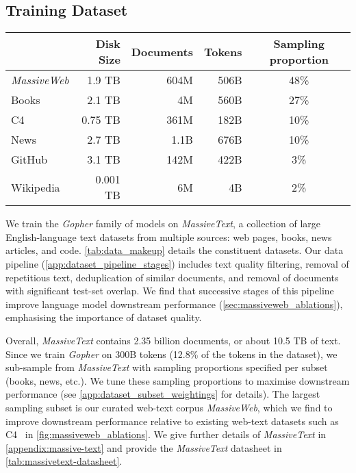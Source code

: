 \documentclass[11pt, a4paper, logo, internal, copyright, nonumbering]{deepmind}
\newcommand{\massivetext}{\textit{MassiveText}\xspace}
\newcommand{\massiveweb}{\textit{MassiveWeb}\xspace}
\newcommand{\gopher}{\textit{Gopher}\xspace}
\begin{document}
\subsection{Training Dataset}
\label{method:dataset}
\begin{table*}[t]
\centering
\begin{tabular}{l r r r c}
\toprule
           & Disk Size & Documents & Tokens  & Sampling proportion \\ 
\midrule
\massiveweb & 1.9 TB  & 604M & 506B & 48\% \\
Books       & 2.1 TB  & 4M   & 560B & 27\% \\
C4          & 0.75 TB  & 361M & 182B & 10\% \\
News        & 2.7 TB  & 1.1B & 676B & 10\% \\
GitHub      & 3.1 TB  & 142M & 422B & 3\% \\ 
Wikipedia   & 0.001 TB & 6M   & 4B  & 2\% \\
\bottomrule
\end{tabular}
    \caption{\textbf{MassiveText data makeup.} For each subset of \massivetext, we list its total disk size, its number of documents, and its number of SentencePiece tokens. During training we sample from \massivetext non-uniformly, using the sampling proportion shown in the right-most column.}
    \label{tab:data_makeup}
\end{table*}

We train the \gopher family of models on \massivetext, a collection of large English-language text datasets from multiple sources: web pages, books, news articles, and code. \autoref{tab:data_makeup} details the constituent datasets. Our data pipeline (\autoref{app:dataset_pipeline_stages}) includes text quality filtering, removal of repetitious text, deduplication of similar documents, and removal of documents with significant test-set overlap. 
We find that successive stages of this pipeline improve language model downstream performance (\autoref{sec:massiveweb_ablations}), emphasising the importance of dataset quality.

Overall, \massivetext contains 2.35 billion documents, or about 10.5 TB of text. 
Since we train \gopher on 300B tokens (12.8\% of the tokens in the dataset), we sub-sample from \massivetext with sampling proportions specified per subset (books, news, etc.). We tune these sampling proportions to maximise downstream performance (see \autoref{app:dataset_subset_weightings} for details). The largest sampling subset is our curated web-text corpus \massiveweb, which we find to improve downstream performance relative to existing web-text datasets such as C4~\citep{raffel2020exploring} in \autoref{fig:massiveweb_ablations}. 
We give further details of \massivetext in \autoref{appendix:massive-text} and provide the \massivetext datasheet in \autoref{tab:massivetext-datasheet}.
\end{document}
